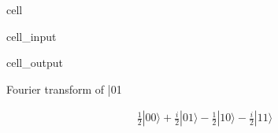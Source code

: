 \documentclass[letterpaper,10pt,english]{jupyterBook}
\begin{document}
\begin{sphinxuseclass}{cell}\begin{sphinxVerbatimInput}

\begin{sphinxuseclass}{cell_input}
\begin{sphinxVerbatim}[commandchars=\\\{\}]

\end{sphinxVerbatim}

\end{sphinxuseclass}\end{sphinxVerbatimInput}
\begin{sphinxVerbatimOutput}

\begin{sphinxuseclass}{cell_output}
\begin{sphinxVerbatim}[commandchars=\\\{\}]
Fourier transform of |01\PYGZgt{}
\end{sphinxVerbatim}
\begin{equation*}
\begin{split}\frac{1}{2} |00\rangle+\frac{i}{2} |01\rangle- \frac{1}{2} |10\rangle- \frac{i}{2} |11\rangle\end{split}
\end{equation*}
\end{sphinxuseclass}\end{sphinxVerbatimOutput}

\end{sphinxuseclass}
\end{document}
